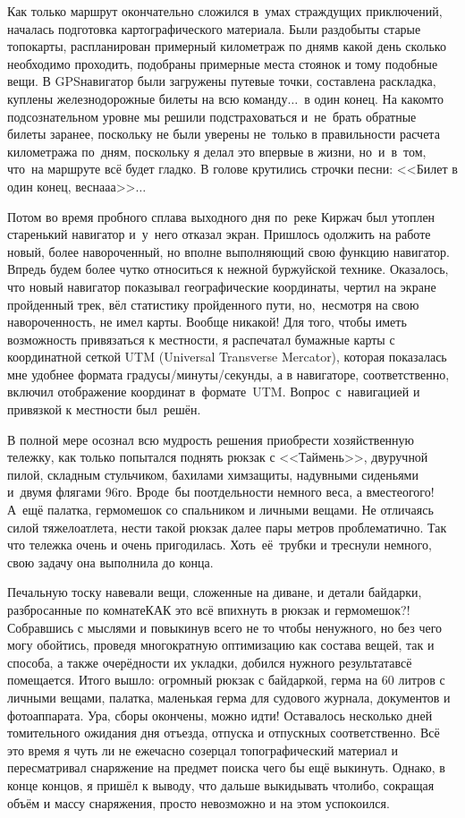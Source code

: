 Как только маршрут окончательно сложился в~умах страждущих приключений, началась подготовка картографического материала. Были раздобыты старые топокарты, распланирован примерный километраж по дням\mdash в какой день сколько необходимо проходить, подобраны примерные места стоянок и тому подобные вещи. В GPS\sdash навигатор были загружены путевые точки, составлена раскладка, куплены железнодорожные билеты на всю команду$\ldots$~в один конец. На каком\sdash то подсознательном уровне мы решили подстраховаться и~не~брать обратные билеты заранее, поскольку не были уверены не~только в правильности расчета километража по~дням, поскольку я делал это впервые в жизни, но~и~в~том, что~на маршруте всё будет гладко. В голове крутились строчки песни: <<Билет в один конец, весна\sdash а\sdash а>>$\ldots$
 
Потом во время пробного сплава выходного дня по~реке Киржач был утоплен старенький навигатор и~у~него отказал экран. Пришлось одолжить на работе новый, более навороченный, но вполне выполняющий свою функцию навигатор. Впредь будем более чутко относиться к нежной буржуйской технике. Оказалось, что новый навигатор показывал географические координаты, чертил на экране пройденный трек, вёл статистику пройденного пути, но,~несмотря на свою навороченность, не имел карты. Вообще никакой! Для того, чтобы иметь возможность привязаться к местности, я распечатал бумажные карты с координатной сеткой UTM (Universal Transverse Mercator), которая показалась мне удобнее формата градусы/минуты/секунды, а в навигаторе, соответственно, включил отображение координат в~формате~UTM. Вопрос~с~навигацией и привязкой к местности был~решён.

В полной мере осознал всю мудрость решения приобрести хозяйственную тележку, как только попытался поднять рюкзак с <<Таймень>>, двуручной пилой, складным стульчиком, бахилами химзащиты, надувными сиденьями и~двумя флягами 96\sdash го. Вроде~бы по\sdash отдельности немного веса, а вместе\mdash ого\sdash го! А~ещё палатка, гермомешок со спальником и личными вещами. Не отличаясь силой тяжелоатлета, нести такой рюкзак далее пары метров проблематично. Так что тележка очень и очень пригодилась. Хоть~её~трубки и треснули немного, свою задачу она выполнила до конца.

Печальную тоску навевали вещи, сложенные на диване, и детали байдарки, разбросанные по комнате\mdash КАК это всё впихнуть в рюкзак и гермомешок?! Собравшись с мыслями и повыкинув всего не то чтобы ненужного, но без чего могу обойтись, проведя многократную оптимизацию как состава вещей, так и способа, а также очерёдности их укладки, добился нужного результата\mdash всё помещается. Итого вышло: огромный рюкзак с байдаркой, герма на 60 литров с личными вещами, палатка, маленькая герма для судового журнала, документов и фотоаппарата. Ура, сборы окончены, можно идти!
\newpage
Оставалось несколько дней томительного ожидания дня отъезда, отпуска и отпускных соответственно. Всё это время я чуть ли не ежечасно созерцал топографический материал и пересматривал снаряжение на предмет поиска чего бы ещё выкинуть. Однако, в конце концов, я пришёл к выводу, что дальше выкидывать что\sdash либо, сокращая объём и массу снаряжения, просто невозможно и на этом успокоился.

\begin{center}
\end{center}